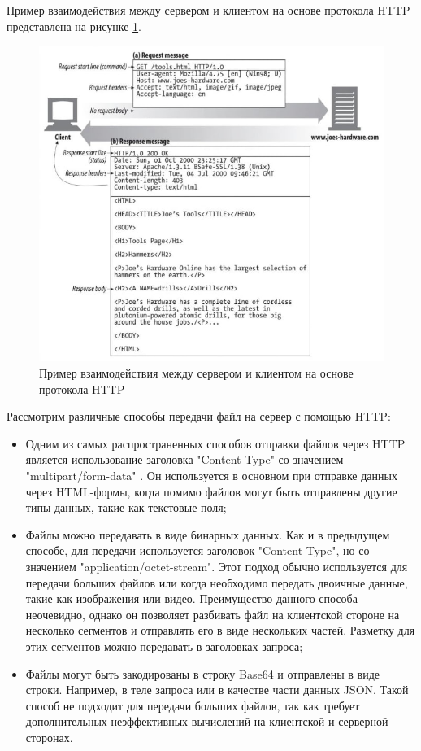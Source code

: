 	Пример взаимодействия между сервером и клиентом на основе протокола HTTP представлена на рисунке \ref{fig:http_scheme}.
	\begin{figure}[ht!] 
		\center
		\includegraphics [scale=0.8] {my_folder/images//http_scheme}
		\caption{Пример взаимодействия между сервером и клиентом на основе протокола HTTP \cite{gourleyHttpGuide}}
		\label{fig:http_scheme}  
	\end{figure}
	
	Рассмотрим различные способы передачи файл на сервер с помощью HTTP:
	\begin{itemize}[label=$\bullet$]
		\item Одним из самых распространенных способов отправки файлов через HTTP является использование заголовка "Content-Type" со значением "multipart/form-data" \cite{rfcHttp10}. Он используется в основном при отправке данных через HTML-формы, когда помимо файлов могут быть отправлены другие типы данных, такие как текстовые поля;
		\item Файлы можно передавать в виде бинарных данных. Как и в предыдущем способе, для передачи используется заголовок "Content-Type", но со значением "application/octet-stream". Этот подход обычно используется для передачи больших файлов или когда необходимо передать двоичные данные, такие как изображения или видео. Преимущество данного способа неочевидно, однако он позволяет разбивать файл на клиентской стороне на несколько сегментов и отправлять его в виде нескольких частей. Разметку для этих сегментов можно передавать в заголовках запроса;
		\item Файлы могут быть закодированы в строку Base64 и отправлены в виде строки. Например, в теле запроса или в качестве части данных JSON. Такой способ не подходит для передачи больших файлов, так как требует дополнительных неэффективных вычислений на клиентской и серверной сторонах.
	\end{itemize}

